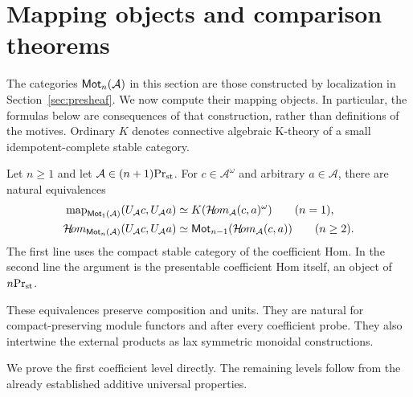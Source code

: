 \section{Mapping objects and comparison theorems}
\label{sec:mapping}\label{sec:comparison}\label{sec:base}

The categories $\mathsf{Mot}_n(\mathcal A)$ in this section are those constructed
by localization in Section~\ref{sec:presheaf}. We now compute their
mapping objects. In particular, the formulas below are consequences
of that construction, rather than definitions of the motives.
Ordinary $K$ denotes connective algebraic K-theory of a small
idempotent-complete stable category.

\begin{theorem}\label{thm:mapping-comparison}
Let $n\geq1$ and let $\mathcal A\in{(n+1)}\mathrm{Pr}_{\mathrm{st}}$.
For $c\in\mathcal A^\omega$ and arbitrary
$a\in\mathcal A$, there are natural equivalences
\begin{align}
 \operatorname{map}_{\mathsf{Mot}_1(\mathcal A)}(U_{\mathcal A}c,U_{\mathcal A}a)
  &\simeq K(\mathcal{H}\!om_{\mathcal A}(c,a)^\omega)
       \qquad(n=1),\label{eq:mapping-height-one}\\
 \mathcal{H}\!om_{\mathsf{Mot}_n(\mathcal A)}(U_{\mathcal A}c,U_{\mathcal A}a)
  &\simeq\mathsf{Mot}_{n-1}(\mathcal{H}\!om_{\mathcal A}(c,a))
       \qquad(n\geq2).\label{eq:mapping-higher}
\end{align}
The first line uses the compact stable category of the coefficient
Hom. In the second line the argument is the presentable coefficient
Hom itself, an object of ${n}\mathrm{Pr}_{\mathrm{st}}$.

These equivalences preserve composition and units. They are natural
for compact-preserving module functors and after every coefficient
probe. They also intertwine the external products as lax symmetric
monoidal constructions.
\end{theorem}

We prove the first coefficient level directly. The remaining levels
follow from the already established additive universal properties.































